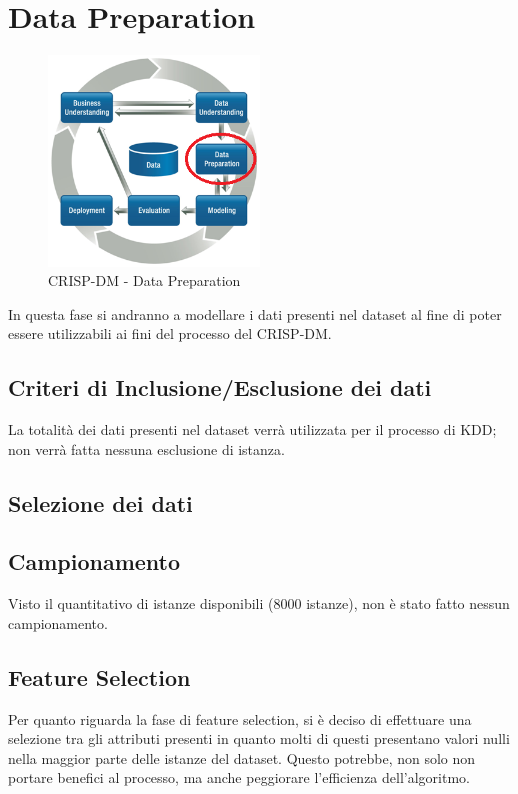 \chapter{Data Preparation}

\begin{figure}[hbtp]
	\centering
	\includegraphics[width=0.5\textwidth]{./images/CRISPDM_3.png}
	\caption{CRISP-DM - Data Preparation}
	\label{CRISPDM_3}
\end{figure}

In questa fase si andranno a modellare i dati presenti nel dataset al fine di poter essere utilizzabili ai fini del processo del CRISP-DM.

\section{Criteri di Inclusione/Esclusione dei dati}

La totalità dei dati presenti nel dataset verrà utilizzata per il processo di KDD; non verrà fatta nessuna esclusione di istanza.

\section{Selezione dei dati}

\section{Campionamento}
Visto il quantitativo di istanze disponibili (8000 istanze), non è stato fatto nessun campionamento.

\section{Feature Selection}
\label{Feature Selection}

Per quanto riguarda la fase di feature selection, si è deciso di effettuare una selezione tra gli attributi presenti in quanto molti di questi presentano valori nulli nella maggior parte delle istanze del dataset. Questo potrebbe, non solo non portare benefici al processo, ma anche peggiorare l'efficienza dell'algoritmo.


